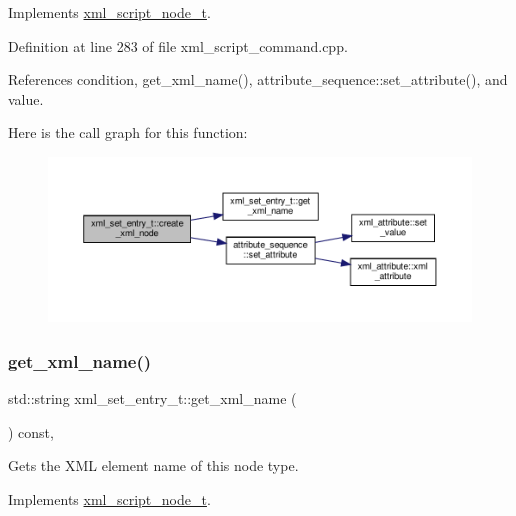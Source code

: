 Implements \hyperlink{classxml__script__node__t_adaf9c51a079c4617f3845c6133eb477f}{xml\+\_\+script\+\_\+node\+\_\+t}.



Definition at line 283 of file xml\+\_\+script\+\_\+command.\+cpp.



References condition, get\+\_\+xml\+\_\+name(), attribute\+\_\+sequence\+::set\+\_\+attribute(), and value.

Here is the call graph for this function\+:
\nopagebreak
\begin{figure}[H]
\begin{center}
\leavevmode
\includegraphics[width=350pt]{d1/d5b/classxml__set__entry__t_ac1b86d13e93d6fb01ace81a603cede2a_cgraph}
\end{center}
\end{figure}
\mbox{\label{classxml__set__entry__t_a0a526ef7f3872e92b59a6f961b3383cf}} 
\subsubsection{\texorpdfstring{get\+\_\+xml\+\_\+name()}{get\_xml\_name()}}
{\footnotesize\ttfamily std\+::string xml\+\_\+set\+\_\+entry\+\_\+t\+::get\+\_\+xml\+\_\+name (\begin{DoxyParamCaption}{ }\end{DoxyParamCaption}) const\hspace{0.3cm}{\ttfamily [override]}, {\ttfamily [virtual]}}



Gets the X\+ML element name of this node type. 



Implements \hyperlink{classxml__script__node__t_af5815fab8924e5e4f47ba1b7266b6cb8}{xml\+\_\+script\+\_\+node\+\_\+t}.



